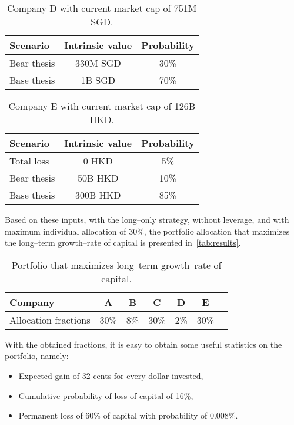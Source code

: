 \documentclass{article}
\begin{document}
\begin{table}[!ht]
\caption{Company D with current market cap of 751M SGD.}
\vspace{0.25cm}
\centering
\begin{tabular}{l|c|c}
Scenario & Intrinsic value & Probability \\
\hline
Bear thesis & 330M SGD & 30\% \\
Base thesis & 1B SGD & 70\% \\
\end{tabular}%
\label{tab:companyD}%
\end{table}%

\begin{table}[!ht]
\caption{Company E with current market cap of 126B HKD.}
\vspace{0.25cm}
\centering
\begin{tabular}{l|c|c}
Scenario & Intrinsic value & Probability \\
\hline
Total loss & 0 HKD & 5\% \\
Bear thesis & 50B HKD & 10\% \\
Base thesis & 300B HKD & 85\% \\
\end{tabular}%
\label{tab:companyE}%
\end{table}%

\noindent Based on these inputs, with the long--only strategy, without leverage,
and with maximum individual allocation of 30\%, the portfolio allocation that
maximizes the long--term growth--rate of capital is presented
in~\autoref{tab:results}.

\begin{table}
\caption{Portfolio that maximizes long--term growth--rate of capital.}
\vspace{0.25cm}
\centering
\begin{tabular}{l|c|c|c|c|c|c}
Company & A & B & C & D & E \\
\hline
Allocation fractions & 30\% & 8\% & 30\% & 2\% & 30\% \\
\end{tabular}%
\label{tab:results}%
\end{table}%

With the obtained fractions, it is easy to obtain some useful
statistics on the portfolio, namely:
\begin{itemize}
    \item Expected gain of 32 cents for every dollar invested,
    \item Cumulative probability of loss of capital of 16\%,
    \item Permanent loss of 60\% of capital with probability of 0.008\%.
\end{itemize}
\end{document}
